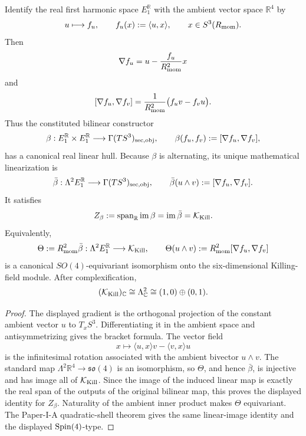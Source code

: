 \documentclass[12pt,a4paper]{article}
\begin{document}
\begin{lemma}
\label{p2b:lem:canonical-bracket-image}
Identify the real first harmonic space \(E_1^{\mathbb R}\) with the ambient
vector space \(\mathbb R^4\) by
\[
 u\longmapsto f_u,\qquad f_u(x):=\langle u,x\rangle,
 \qquad x\in S^3(R_{\mathrm{mom}}).
\]
Then
\[
 \nabla f_u=u-\frac{f_u}{R_{\mathrm{mom}}^2}x
\]
and
\[
 [\nabla f_u,\nabla f_v]
 =\frac1{R_{\mathrm{mom}}^2}\bigl(f_u v-f_v u\bigr).
\]
Thus the constituted bilinear constructor
\[
 \beta:E_1^{\mathbb R}\times E_1^{\mathbb R}
 \longrightarrow\Gamma(TS^3)_{\rm sec,obj},\qquad
 \beta(f_u,f_v):=[\nabla f_u,\nabla f_v],
\]
has a canonical real linear hull.  Because \(\beta\) is alternating, its
unique mathematical linearization is
\[
 \bar\beta:\Lambda^2E_1^{\mathbb R}
 \longrightarrow\Gamma(TS^3)_{\rm sec,obj},
 \qquad
 \bar\beta(u\wedge v):=[\nabla f_u,\nabla f_v].
\]
It satisfies
\[
 Z_\beta:=\operatorname{span}_{\mathbb R}\operatorname{im}\beta
 =\operatorname{im}\bar\beta
 =\mathcal K_{\rm Kill}.
\]
Equivalently,
\[
 \Theta:=R_{\mathrm{mom}}^2\bar\beta:
 \Lambda^2E_1^{\mathbb R}\longrightarrow\mathcal K_{\rm Kill},
 \qquad
 \Theta(u\wedge v):=R_{\mathrm{mom}}^2[\nabla f_u,\nabla f_v]
\]
is a canonical \(SO(4)\)-equivariant isomorphism onto the six-dimensional
Killing-field module.  After complexification,
\[
 (\mathcal K_{\rm Kill})_{\mathbb C}
 \cong\Lambda^2_{\mathbb C}
 \cong(1,0)\oplus(0,1).
\]
\end{lemma}

\begin{proof}
The displayed gradient is the orthogonal projection of the constant ambient
vector \(u\) to \(T_xS^3\).  Differentiating it in the ambient space and
antisymmetrizing gives the bracket formula.  The vector field
\[
 x\longmapsto\langle u,x\rangle v-\langle v,x\rangle u
\]
is the infinitesimal rotation associated with the ambient bivector
\(u\wedge v\).  The standard map \(\Lambda^2\mathbb R^4\to\mathfrak{so}(4)\)
is an isomorphism, so \(\Theta\), and hence \(\bar\beta\), is injective and
has image all of \(\mathcal K_{\rm Kill}\).  Since the image of the induced
linear map is exactly the real span of the outputs of the original bilinear
map, this proves the displayed identity for \(Z_\beta\).  Naturality of the
ambient inner product makes \(\Theta\) equivariant.  The Paper-I-A
quadratic-shell theorem gives the same linear-image identity and the displayed
\(\mathrm{Spin}(4)\)-type.
\end{proof}
\end{document}
